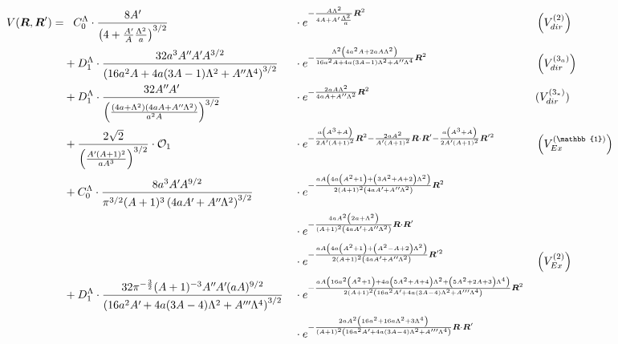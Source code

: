 \documentclass
[aps,nofootinbib,prl,showpacs,twocolumn,groupedaddress,superscriptaddress]
{revtex4}
\newcommand*{\mprime}{^{\prime}\mkern-1.2mu}
\newcommand*{\mdprime}{^{\prime\prime}\mkern-1.2mu}
\newcommand*{\mtprime}{^{\prime\prime\prime}\mkern-1.2mu}
\newcommand{\ve}[1]{\ensuremath{\boldsymbol{#1}}}
\begin{document}
\begin{widetext}

\begin{align*}
V(\ve{R},\ve{R}')=&
\;\;\;C_0^\Lambda\cdot\frac{8A\mprime}{\left(4+\frac{A\mprime}{A}\frac{\Lambda^2}{a}\right)^{3/2}}&&\cdot
e^{-\frac{A\Lambda^2}{4A+A\mprime\frac{\Lambda^2}{a}}\ve{R}^2}&&\left(V^{(2)}_{dir}\right)\\
%
&+D_1^\Lambda\cdot\frac{32 a^3 A\mdprime A\mprime A^{3/2}}{\left(16 a^2 A+4 a (3 A-1) \Lambda ^2+A\mdprime \Lambda ^4\right)^{3/2}}
&&\cdot
e^{-\frac{\Lambda ^2 \left(4 a^2 A+2 a A \Lambda ^2\right)}{16 a^2 A+4 a (3 A-1) \Lambda ^2+A\mdprime \Lambda ^4}\ve{R}^2}&&\left(V^{(3_a)}_{dir}\right)\\
%
&+D_1^\Lambda\cdot\frac{32  A\mdprime A\mprime}{\left(\frac{\left(4 a+\Lambda ^2\right) \left(4 a A+A\mdprime \Lambda ^2\right)}{a^2 A}\right)^{3/2}}
&&\cdot e^{-\frac{2 a A \Lambda ^2}{4 a A+A\mdprime \Lambda ^2}\ve{R}^2}&&(V^{(3_*)}_{dir})\\
%
&+\frac{2 \sqrt{2}}{\left(\frac{A\mprime (A+1)^2}{a A^3}\right)^{3/2}}\cdot\mathcal{O}_1
&&\cdot e^{-\frac{a \left(A^3+A\right)}{2 A\mprime (A+1)^2}\ve{R}^2-\frac{2 a A^2}{A\mprime (A+1)^2}\ve{R}\cdot\ve{R}'-\frac{a \left(A^3+A\right)}{2 A\mprime (A+1)^2}\ve{R}'^2}&&\left(V^{(\mathbb{1})}_{Ex}\right)\\
&+C_0^\Lambda\cdot\frac{8 a^3 A\mprime A^{9/2}}{\pi ^{3/2} (A+1)^3 \left(4 a A\mprime+A\mdprime \Lambda ^2\right)^{3/2}}
&&\cdot e^{-\frac{a A \left(4 a \left(A^2+1\right)+\left(3 A^2+A+2\right) \Lambda ^2\right)}{2 (A+1)^2 \left(4 a A\mprime+A\mdprime \Lambda ^2\right)}\ve{R}^2}\\
&&&\cdot e^{-\frac{4a A^2 \left(2 a+\Lambda ^2\right)}{(A+1)^2 \left(4 a A\mprime+A\mdprime \Lambda ^2\right)}\ve{R}\cdot\ve{R}'}\\
&&&\cdot e^{-\frac{a A \left(4 a \left(A^2+1\right)+\left(A^2-A+2\right) \Lambda ^2\right)}{2 (A+1)^2 \left(4 a A\mprime+A\mdprime \Lambda ^2\right)}\ve{R}'^2}&&\left(V^{(2)}_{Ex}\right)\\
%
&+D_1^\Lambda\cdot\frac{32 \pi ^{-\frac{3}{2}} (A+1)^{-3} A\mdprime A\mprime (a A)^{9/2}}{ \left(16 a^2 A\mprime+4 a (3 A-4) \Lambda ^2+A\mtprime \Lambda ^4\right)^{3/2}}
&&\cdot e^{-\frac{a A \left(16 a^2 \left(A^2+1\right)+4 a \left(5 A^2+A+4\right) \Lambda ^2+\left(5 A^2+2 A+3\right) \Lambda ^4\right)}{2 (A+1)^2 \left(16 a^2 A\mprime+4 a (3 A-4) \Lambda ^2+A\mtprime \Lambda ^4\right)}\ve{R}^2}\\
&&&\cdot e^{-\frac{2 a A^2 \left(16 a^2+16 a \Lambda ^2+3 \Lambda ^4\right)}{(A+1)^2 \left(16 a^2 A\mprime+4 a (3 A-4) \Lambda ^2+A\mtprime \Lambda ^4\right)}\ve{R}\cdot\ve{R}'}\\

\end{align*}
\end{widetext}
\end{document}
